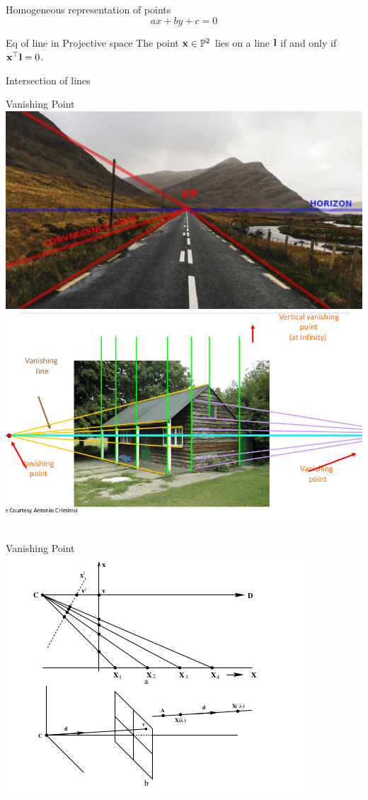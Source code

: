 \documentclass[times]{beamer}
\begin{document}
    \begin{frame}{Homogeneous representation of points}
      \[ ax + by + c = 0\]
    \end{frame}

    \begin{frame}{Eq of line in Projective space}
      The point $\mathbf{x} \in \mathbb{P}^2$ lies on a line $\mathbf{l}$ if and only if
      $\mathbf{x}^\top \mathbf{l} = 0$.
      \end{frame}
      \begin{frame}{Intersection of lines}
        \end{frame}

  \begin{frame}{Vanishing Point}
    \includegraphics[width=0.7\linewidth]{media/vanishing-lines.jpeg}
    \\
    \includegraphics[width=0.7\linewidth]{media/vanishing-points.png}
  \end{frame}

  \begin{frame}{Vanishing Point}
    \includegraphics[width=0.5\linewidth]{media/vanishing-point-formation.png}
  \end{frame}
\end{document}
